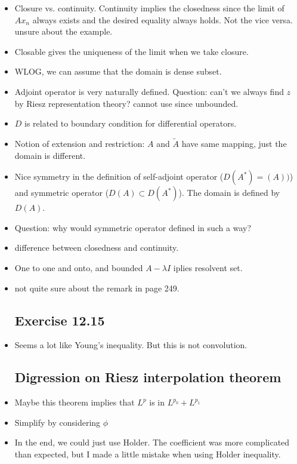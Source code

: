 \documentclass{article}
\theoremstyle{remark}
\begin{document}
\begin{itemize}
\item Closure vs. continuity. Continuity implies the closedness since the limit of $Ax_n$ always exists and the desired equality always holds. Not the vice versa. unsure about the example. 
\item Closable gives the uniqueness of the limit when we take closure.
\item WLOG, we can assume that the domain is dense subset.
\item Adjoint operator is very naturally defined. Question: can't we always find $z$ by Riesz representation theory? cannot use since unbounded.
\item $D$ is related to boundary condition for differential operators.
\item Notion of extension and restriction: $A$ and $\tilde A$ have same mapping, just the domain is different.
\item Nice symmetry in the definition of self-adjoint operator ($D(A^*)=(A))$) and symmetric operator ($D(A)\subset D(A^*)$). The domain is defined by $D(A)$.
\item Question: why would symmetric operator defined in such a way?
\item difference between closedness and continuity.
\item One to one and onto, and bounded $A-\lambda I$ iplies resolvent set.
\item not quite sure about the remark in page 249.











\subsection*{Exercise 12.15}
\item Seems a lot like Young's inequality. But this is not convolution.
\subsection*{Digression on Riesz interpolation theorem}
\item Maybe this theorem implies that $L^p$ is in $L^{p_0}+L^{p_1}$
\item Simplify by considering $\phi$
\item In the end, we could just use Holder. The coefficient was more complicated than expected, but I made a little mistake when using Holder inequality.

\end{itemize}
\end{document}
